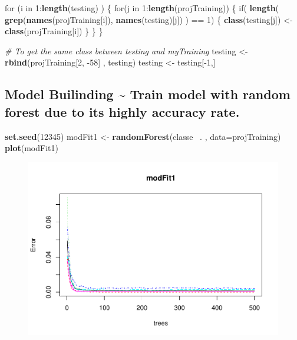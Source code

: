 \documentclass[]{article}
\newenvironment{Shaded}{\begin{snugshade}}{\end{snugshade}}
\newcommand{\KeywordTok}[1]{\textcolor[rgb]{0.13,0.29,0.53}{\textbf{{#1}}}}
\newcommand{\DataTypeTok}[1]{\textcolor[rgb]{0.13,0.29,0.53}{{#1}}}
\newcommand{\DecValTok}[1]{\textcolor[rgb]{0.00,0.00,0.81}{{#1}}}
\newcommand{\StringTok}[1]{\textcolor[rgb]{0.31,0.60,0.02}{{#1}}}
\newcommand{\CommentTok}[1]{\textcolor[rgb]{0.56,0.35,0.01}{\textit{{#1}}}}
\newcommand{\NormalTok}[1]{{#1}}
\begin{document}
\begin{Shaded}
\begin{Highlighting}[]
\NormalTok{for (i in }\DecValTok{1}\NormalTok{:}\KeywordTok{length}\NormalTok{(testing) ) \{}
    \NormalTok{for(j in }\DecValTok{1}\NormalTok{:}\KeywordTok{length}\NormalTok{(projTraining)) \{}
        \NormalTok{if( }\KeywordTok{length}\NormalTok{( }\KeywordTok{grep}\NormalTok{(}\KeywordTok{names}\NormalTok{(projTraining[i]), }\KeywordTok{names}\NormalTok{(testing)[j]) ) ==}\StringTok{ }\DecValTok{1}\NormalTok{)  \{}
            \KeywordTok{class}\NormalTok{(testing[j]) <-}\StringTok{ }\KeywordTok{class}\NormalTok{(projTraining[i])}
        \NormalTok{\}      }
    \NormalTok{\}      }
\NormalTok{\}}

\CommentTok{# To get the same class between testing and myTraining}
\NormalTok{testing <-}\StringTok{ }\KeywordTok{rbind}\NormalTok{(projTraining[}\DecValTok{2}\NormalTok{, -}\DecValTok{58}\NormalTok{] , testing)}
\NormalTok{testing <-}\StringTok{ }\NormalTok{testing[-}\DecValTok{1}\NormalTok{,]}
\end{Highlighting}
\end{Shaded}

\subsection{Model Builinding \textasciitilde{} Train model with random
forest due to its highly accuracy
rate.}\label{model-builinding-train-model-with-random-forest-due-to-its-highly-accuracy-rate.}

\begin{Shaded}
\begin{Highlighting}[]
\KeywordTok{set.seed}\NormalTok{(}\DecValTok{12345}\NormalTok{)}
\NormalTok{modFit1 <-}\StringTok{ }\KeywordTok{randomForest}\NormalTok{(classe ~. , }\DataTypeTok{data=}\NormalTok{projTraining)}
\KeywordTok{plot}\NormalTok{(modFit1)}
\end{Highlighting}
\end{Shaded}

\begin{figure}[htbp]
\centering
\includegraphics{ML_Project_files/figure-latex/unnamed-chunk-9-1.pdf}
\caption{}
\end{figure}
\end{document}
